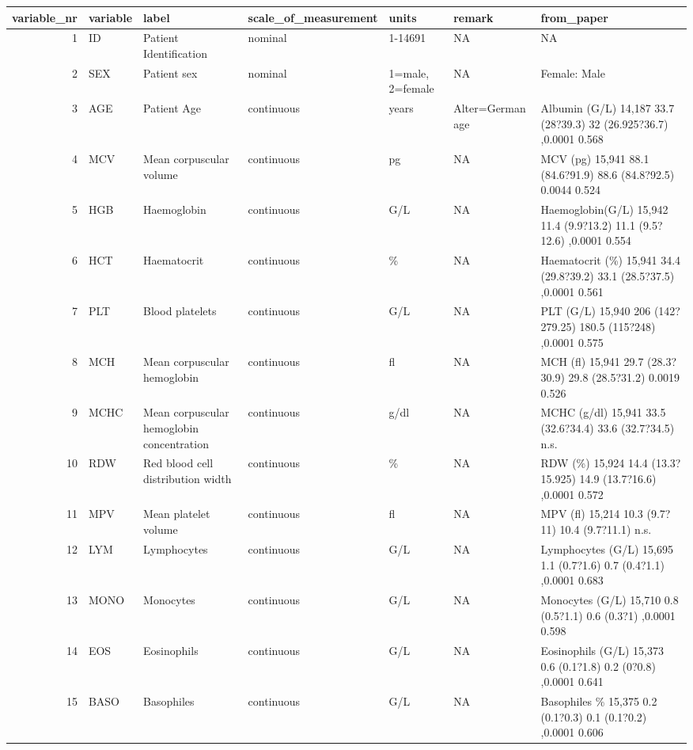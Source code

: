 \documentclass[
  letterpaper,
  DIV=11,
  numbers=noendperiod]{scrreport}
\begin{document}
\captionsetup[table]{labelformat=empty,skip=1pt}
\begin{longtable}{rllllll}
\toprule
variable\_nr & variable & label & scale\_of\_measurement & units & remark & from\_paper \\ 
\midrule
1 & ID & Patient Identification & nominal & 1-14691 & NA & NA \\ 
2 & SEX & Patient sex & nominal & 1=male, 2=female & NA & Female: Male \\ 
3 & AGE & Patient Age & continuous & years & Alter=German age & Albumin (G/L) 14,187 33.7 (28?39.3) 32 (26.925?36.7) ,0.0001 0.568 \\ 
4 & MCV & Mean corpuscular volume & continuous & pg & NA & MCV (pg) 15,941 88.1 (84.6?91.9) 88.6 (84.8?92.5) 0.0044 0.524 \\ 
5 & HGB & Haemoglobin & continuous & G/L & NA & Haemoglobin(G/L) 15,942 11.4 (9.9?13.2) 11.1 (9.5?12.6) ,0.0001 0.554 \\ 
6 & HCT & Haematocrit & continuous & \% & NA & Haematocrit (\%) 15,941 34.4 (29.8?39.2) 33.1 (28.5?37.5) ,0.0001 0.561 \\ 
7 & PLT & Blood platelets & continuous & G/L & NA & PLT (G/L) 15,940 206 (142?279.25) 180.5 (115?248) ,0.0001 0.575 \\ 
8 & MCH & Mean corpuscular hemoglobin & continuous & fl & NA & MCH (fl) 15,941 29.7 (28.3?30.9) 29.8 (28.5?31.2) 0.0019 0.526 \\ 
9 & MCHC & Mean corpuscular hemoglobin concentration & continuous & g/dl & NA & MCHC (g/dl) 15,941 33.5 (32.6?34.4) 33.6 (32.7?34.5) n.s. \\ 
10 & RDW & Red blood cell distribution width & continuous & \% & NA & RDW (\%) 15,924 14.4 (13.3?15.925) 14.9 (13.7?16.6) ,0.0001 0.572 \\ 
11 & MPV & Mean platelet volume & continuous & fl & NA & MPV (fl) 15,214 10.3 (9.7?11) 10.4 (9.7?11.1) n.s. \\ 
12 & LYM & Lymphocytes & continuous & G/L & NA & Lymphocytes (G/L) 15,695 1.1 (0.7?1.6) 0.7 (0.4?1.1) ,0.0001 0.683 \\ 
13 & MONO & Monocytes & continuous & G/L & NA & Monocytes (G/L) 15,710 0.8 (0.5?1.1) 0.6 (0.3?1) ,0.0001 0.598 \\ 
14 & EOS & Eosinophils & continuous & G/L & NA & Eosinophils (G/L) 15,373 0.6 (0.1?1.8) 0.2 (0?0.8) ,0.0001 0.641 \\ 
15 & BASO & Basophiles & continuous & G/L & NA & Basophiles \% 15,375 0.2 (0.1?0.3) 0.1 (0.1?0.2) ,0.0001 0.606 \\ 

\end{longtable}
\end{document}
